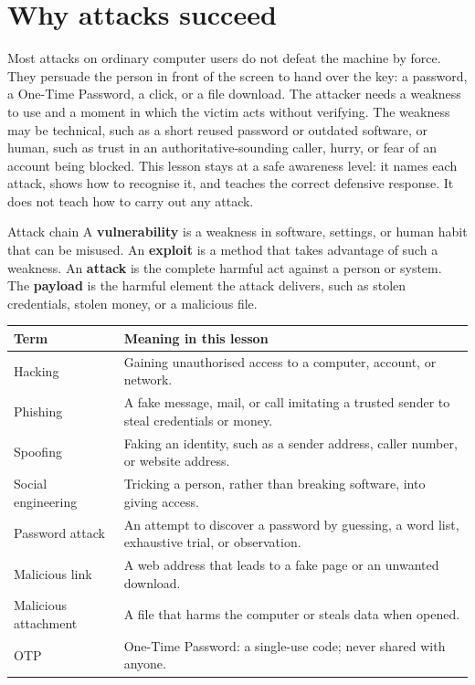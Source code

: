 \section{Why attacks succeed}
Most attacks on ordinary computer users do not defeat the machine by
force. They persuade the person in front of the screen to hand over the
key: a password, a One-Time Password, a click, or a file download. The
attacker needs a weakness to use and a moment in which the victim acts
without verifying. The weakness may be technical, such as a short reused
password or outdated software, or human, such as trust in an
authoritative-sounding caller, hurry, or fear of an account being
blocked. This lesson stays at a safe awareness level: it names each
attack, shows how to recognise it, and teaches the correct defensive
response. It does not teach how to carry out any attack.

\begin{definitionbox}{Attack chain}
A \textbf{vulnerability} is a weakness in software, settings, or human
habit that can be misused. An \textbf{exploit} is a method that takes
advantage of such a weakness. An \textbf{attack} is the complete harmful
act against a person or system. The \textbf{payload} is the harmful
element the attack delivers, such as stolen credentials, stolen money,
or a malicious file.
\end{definitionbox}

\begin{center}
\begin{tabular}{p{}p{}}
\toprule
\textbf{Term} & \textbf{Meaning in this lesson} \\
\midrule
Hacking & Gaining unauthorised access to a computer, account, or network. \\
Phishing & A fake message, mail, or call imitating a trusted sender to steal credentials or money. \\
Spoofing & Faking an identity, such as a sender address, caller number, or website address. \\
Social engineering & Tricking a person, rather than breaking software, into giving access. \\
Password attack & An attempt to discover a password by guessing, a word list, exhaustive trial, or observation. \\
Malicious link & A web address that leads to a fake page or an unwanted download. \\
Malicious attachment & A file that harms the computer or steals data when opened. \\
OTP & One-Time Password: a single-use code; never shared with anyone. \\
\bottomrule
\end{tabular}
\end{center}

